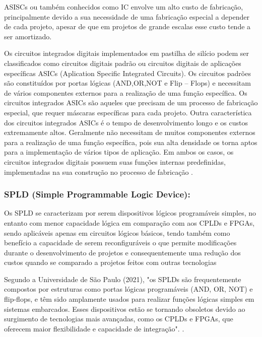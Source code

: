 ASISCs ou também conhecidos como IC envolve um alto custo de fabricação, principalmente devido a sua necessidade de uma fabricação especial a depender de cada projeto, apesar de que em projetos de grande escalas esse custo tende a ser amortizado.

\begin{citacaodireta}
Os circuitos integrados digitais implementados em pastilha de silício podem ser classificados como circuitos digitais padrão ou circuitos digitais de aplicações específicas ASICs (Aplication Specific Integrated Circuits). Os circuitos padrões são constituídos por portas lógicas (AND,OR,NOT e Flip – Flops) e necessitam de vários componentes externos para a realização de uma função específica. Os circuitos integrados ASICs são aqueles que precisam de um processo de fabricação especial, que requer máscaras específicas para cada projeto. Outra característica dos circuitos integrados ASICs é o tempo de desenvolvimento longo e os custos extremamente altos. Geralmente não necessitam de muitos componentes externos para a realização de uma função específica, pois sua alta densidade os torna aptos para a implementação de vários tipos de aplicação. Em ambos os casos, os circuitos integrados digitais possuem suas funções internas predefinidas, implementadas na sua construção no processo de fabricação
\cite[25]{Oliveira2011}.
\end{citacaodireta}


\subsubsection{\esp SPLD (Simple Programmable Logic Device):}

Os SPLD se caracterizam por serem dispositivos lógicos programáveis simples, no entanto com menor capacidade lógica em comparação com aos CPLDs e FPGAs, sendo aplicáveis apenas em circuitos lógicos básicos, tendo também como benefício a capacidade de serem reconfiguráveis o que permite modificações durante o desenvolvimento de projetos e consequentemente uma redução dos custos quando se comparado a projetos feitos com outras tecnologias
\cite{Freitas2015}

\begin{citacaodireta}
Segundo a Universidade de São Paulo (2021), "os SPLDs são frequentemente compostos por estruturas como portas lógicas programáveis (AND, OR, NOT) e flip-flops, e têm sido amplamente usados para realizar funções lógicas simples em sistemas embarcados. Esses dispositivos estão se tornando obsoletos devido ao surgimento de tecnologias mais avançadas, como os CPLDs e FPGAs, que oferecem maior flexibilidade e capacidade de integração".
\cite[25]{USP-eDisciplinas}.
\end{citacaodireta}

